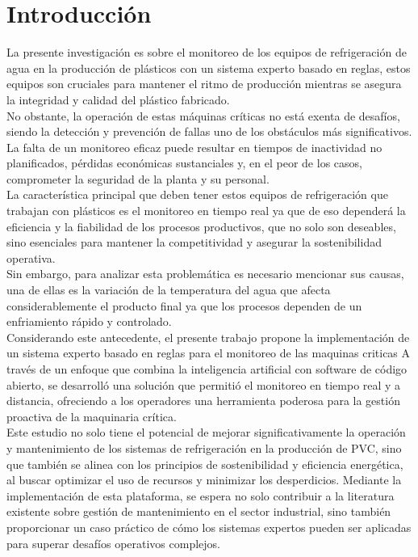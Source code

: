 \fancyhead{}
\fancyfoot{}
\cfoot{\thepage}

\chapter{Introducción}

La presente investigación es sobre el monitoreo de los equipos de refrigeración de agua en la producción de plásticos con un sistema experto basado en reglas, estos equipos son cruciales para mantener el ritmo de producción mientras se asegura la integridad y calidad del plástico fabricado. \\
No obstante, la operación de estas máquinas críticas no está exenta de desafíos, siendo la detección y prevención de fallas uno de los obstáculos más significativos.\\
La falta de un monitoreo eficaz puede resultar en tiempos de inactividad no planificados, pérdidas económicas sustanciales y, en el peor de los casos, comprometer la seguridad de la planta y su personal.\\
La característica principal que deben tener estos equipos de refrigeración que trabajan con plásticos es el monitoreo en tiempo real ya que de eso dependerá la eficiencia y la fiabilidad de los procesos productivos, que no solo son deseables, sino esenciales para mantener la competitividad y asegurar la sostenibilidad operativa. \\
Sin embargo, para analizar esta problemática es necesario mencionar sus causas, una de ellas es la variación de la temperatura del agua que afecta considerablemente el producto final ya que los procesos dependen de un enfriamiento rápido y controlado.\\
Considerando este antecedente, el presente trabajo propone la implementación de un sistema experto basado en reglas para el monitoreo de las maquinas criticas
 A través de un enfoque que combina la inteligencia artificial con software de código abierto, se desarrolló una solución que permitió el monitoreo en tiempo real y a distancia, ofreciendo a los operadores una herramienta poderosa para la gestión proactiva de la maquinaria crítica.\\
Este estudio no solo tiene el potencial de mejorar significativamente la operación y mantenimiento de los sistemas de refrigeración en la producción de PVC, sino que también se alinea con los principios de sostenibilidad y eficiencia energética, al buscar optimizar el uso de recursos y minimizar los desperdicios. Mediante la implementación de esta plataforma, se espera no solo contribuir a la literatura existente sobre gestión de mantenimiento en el sector industrial, sino también proporcionar un caso práctico de cómo los sistemas expertos pueden ser aplicadas para superar desafíos operativos complejos.
 


